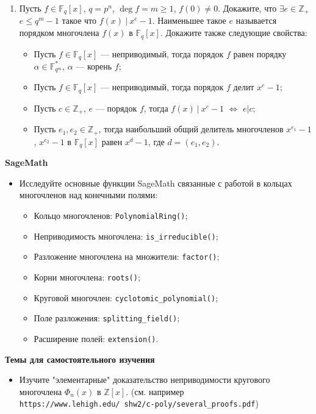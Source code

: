 \begin{enumerate}[topsep=0pt]
    \item Пусть $f\in \mathbb{F}_q[x]$, $q=p^n$, $\deg f = m \geqslant 1$, $f(0) \neq 0$. Докажите, что $\exists e \in \mathbb{Z_+}$ $e\leqslant q^m-1$ такое что $f(x)\ |\ x^e-1$. Наименьшее такое $e$ называется порядком многочлена $f(x)$ в $\mathbb{F}_q[x]$. Докажите также следующие свойства:
    \begin{itemize}[noitemsep,topsep=0pt]
        \item Пусть $f\in \mathbb{F}_q[x]$ --- неприводимый, тогда порядок $f$ равен порядку $\alpha \in \mathbb{F}_{q^m}^*$, $\alpha$ --- корень $f$;
        \item Пусть $f\in \mathbb{F}_q[x]$ --- неприводимый, тогда порядок $f$ делит $x^e-1$;
        \item Пусть $c\in \mathbb{Z}_+$, $e$ --- порядок $f$, тогда $f(x)\ |\ x^c-1$ $\Leftrightarrow$ $e|c$;
        \item Пусть $e_1, e_2\in \mathbb{Z}_+$, тогда наибольший общий делитель многочленов $x^{e_1}-1$, $x^{e_2}-1$ в $\mathbb{F}_q[x]$ равен $x^d-1$, где $d=(e_1,e_2)$.

        
    \end{itemize} %
\end{enumerate}


\noindent\textbf{SageMath}
\begin{itemize}[topsep=0pt]
    \item Исследуйте основные функции SageMath связанные с работой в кольцах многочленов над конечными полями:
    \begin{itemize}[noitemsep,topsep=0pt]
        \item Кольцо многочленов: \texttt{PolynomialRing()};
        \item Неприводимость многочлена: \texttt{is\_irreducible()};
        \item Разложение многочлена на множители: \texttt{factor()};
        \item Корни многочлена: \texttt{roots()};
        \item Круговой многочлен: \texttt{cyclotomic\_polynomial()};
        \item Поле разложения: \texttt{splitting\_field()};
        \item Расширение полей: \texttt{extension()}.
     \end{itemize}
        
\end{itemize}

\noindent\textbf{Темы для самостоятельного изучения}
\begin{itemize}[topsep=0pt]
    \item Изучите "элементарные" доказательство неприводимости кругового многочлена $\Phi_n(x)$ в $\mathbb{Z}[x]$.
    (см. например \texttt{https://www.lehigh.edu/~shw2/c-poly/several\_proofs.pdf})

\end{itemize}
